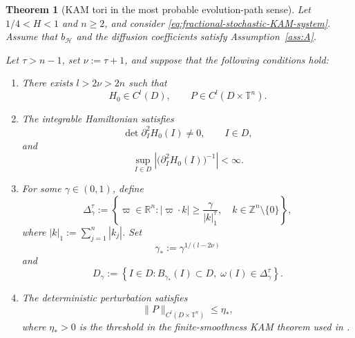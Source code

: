 \documentclass[preprint,12pt]{elsarticle}
\newtheorem{theorem}{Theorem}[section]
\theoremstyle{definition}
\theoremstyle{plain}
\begin{document}
\begin{theorem}[KAM tori in the most probable evolution-path sense]
\label{thm:fractional-most-probable-KAM-tori}
Let $1/4<H<1$ and $n\geq2$, and consider
\eqref{eq:fractional-stochastic-KAM-system}. Assume that
$b_{\mathscr H}$ and the diffusion coefficients satisfy
Assumption~\ref{ass:A}.

Let $\tau>n-1$, set $\nu:=\tau+1$, and suppose that the following
conditions hold:
\begin{enumerate}
    \item There exists $l>2\nu>2n$ such that
    \begin{equation*}
        H_0\in C^l(D),
        \qquad
        P\in C^l(D\times\mathbb T^n).
    \end{equation*}

    \item The integrable Hamiltonian satisfies
    \begin{equation*}
        \det\partial_I^2H_0(I)\neq0,
        \qquad
        I\in D,
    \end{equation*}
    and
    \begin{equation*}
        \sup_{I\in D}
        \left|
            \bigl(\partial_I^2H_0(I)\bigr)^{-1}
        \right|
        <\infty.
    \end{equation*}

    \item For some $\gamma\in(0,1)$, define
    \begin{equation*}
        \Delta_\gamma^\tau
        :=
        \left\{
            \varpi\in\mathbb R^n:
            |\varpi\cdot k|
            \geq
            \frac{\gamma}{|k|_1^\tau},
            \quad
            k\in\mathbb Z^n\setminus\{0\}
        \right\},
    \end{equation*}
    where $|k|_1:=\sum_{j=1}^n|k_j|$. Set
    \begin{equation*}
        \gamma_*:=\gamma^{1/(l-2\nu)}
    \end{equation*}
    and
    \begin{equation*}
        D_\gamma
        :=
        \left\{
            I\in D:
            B_{\gamma_*}(I)\subset D,\;
            \omega(I)\in\Delta_\gamma^\tau
        \right\}.
    \end{equation*}

    \item The deterministic perturbation satisfies
    \begin{equation*}
        \|P\|_{C^l(D\times\mathbb T^n)}
        \leq
        \eta_*,
    \end{equation*}
    where $\eta_*>0$ is the threshold in the finite-smoothness KAM
    theorem used in \cite{xinze2026most}.
\end{enumerate}


\end{theorem}
\end{document}
